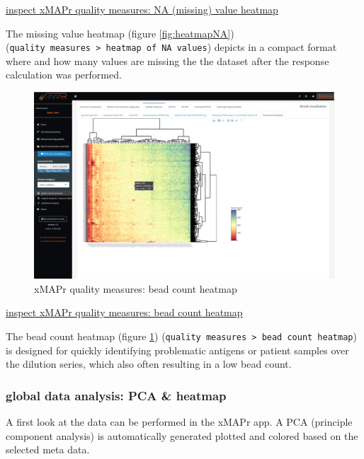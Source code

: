 \documentclass[
]{book}
\begin{document}
\href{figures/quality_measures__NA_value_heatmap.png}{inspect xMAPr quality measures: NA (missing) value heatmap}

The missing value heatmap (figure \ref{fig:heatmapNA}) (\texttt{quality\ measures\ \textgreater{}\ heatmap\ of\ NA\ values}) depicts in a compact format where and how many values are missing the the dataset after the response calculation was performed.

\begin{figure}
\includegraphics[width=50.5in]{figures/quality_measures__bead_count_heatmap} \caption{xMAPr quality measures: bead count heatmap}\label{fig:heatmapBeadCount}
\end{figure}

\href{figures/quality_measures__bead_count_heatmap.png}{inspect xMAPr quality measures: bead count heatmap}

The bead count heatmap (figure \ref{fig:heatmapBeadCount}) (\texttt{quality\ measures\ \textgreater{}\ bead\ count\ heatmap}) is designed for quickly identifying problematic antigens or patient samples over the dilution series, which also often resulting in a low bead count.

\hypertarget{global-data-analysis-pca-heatmap}{%
\subsubsection{global data analysis: PCA \& heatmap}\label{global-data-analysis-pca-heatmap}}

A first look at the data can be performed in the xMAPr app. A PCA (principle component analysis) is automatically generated plotted and colored based on the selected meta data.
\end{document}
